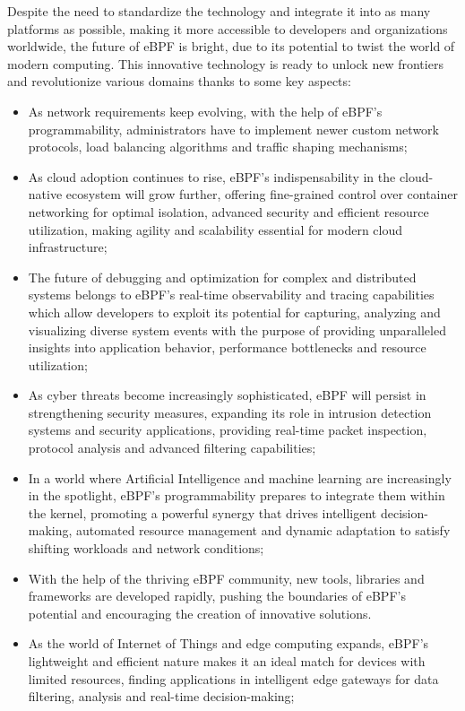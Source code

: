 Despite the need to standardize the technology and integrate it into as many platforms as possible, making it more accessible to developers and organizations worldwide, the future of eBPF is bright, due to its potential to twist the world of modern computing.
This innovative technology is ready to unlock new frontiers and revolutionize various domains thanks to some key aspects:

\begin{itemize}
	\item As network requirements keep evolving, with the help of eBPF's 
		programmability, administrators have to implement newer custom network protocols, load balancing algorithms and traffic shaping mechanisms;
	\item As cloud adoption continues to rise, eBPF's indispensability in the
		cloud-native ecosystem will grow further, offering fine-grained control over container networking for optimal isolation, advanced security and efficient resource utilization, making agility and scalability essential for modern cloud infrastructure;
	\item The future of debugging and optimization for complex and distributed systems
		belongs to eBPF's real-time observability and tracing capabilities which allow developers to exploit its potential for capturing, analyzing and visualizing diverse system events with the purpose of providing unparalleled insights into application behavior, performance bottlenecks and resource utilization;
	\item As cyber threats become increasingly sophisticated, eBPF will persist in
		strengthening security measures, expanding its role in intrusion detection systems and security applications, providing real-time packet inspection, protocol analysis and advanced filtering capabilities;
	\item In a world where Artificial Intelligence and machine learning are
		increasingly in the spotlight, eBPF's programmability prepares to integrate them within the kernel, promoting a powerful synergy that drives intelligent decision-making, automated resource management and dynamic adaptation to satisfy shifting workloads and network conditions;
	\item With the help of the thriving eBPF community, new tools, libraries and
		frameworks are developed rapidly, pushing the boundaries of eBPF's potential and encouraging the creation of innovative solutions.
	\item As the world of Internet of Things and edge computing expands, eBPF's
		lightweight and efficient nature makes it an ideal match for devices with limited resources, finding applications in intelligent edge gateways for data filtering, analysis and real-time decision-making;
\end{itemize}

